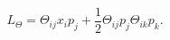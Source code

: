 \begin{equation}
L_{\Theta}=\Theta_{ij}x_{i}p_{j}+\frac{1}{2}
\Theta_{ij}p_{j}\Theta_{ik}p_{k}.
\end{equation}

